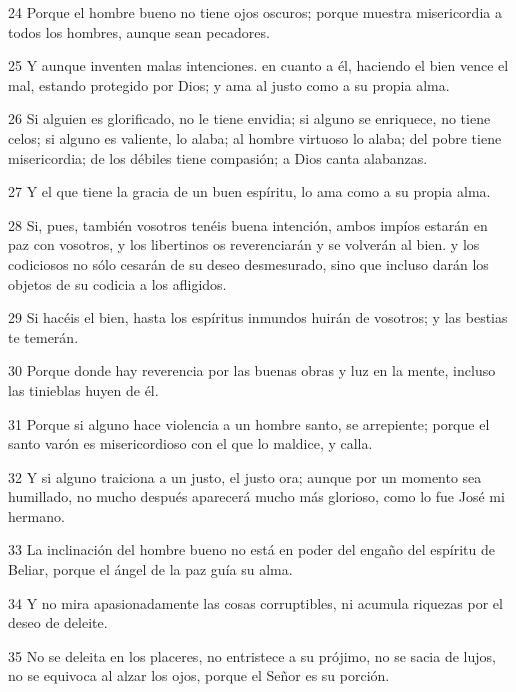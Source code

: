\par 24 Porque el hombre bueno no tiene ojos oscuros; porque muestra misericordia a todos los hombres, aunque sean pecadores.

\par 25 Y aunque inventen malas intenciones. en cuanto a él, haciendo el bien vence el mal, estando protegido por Dios; y ama al justo como a su propia alma.

\par 26 Si alguien es glorificado, no le tiene envidia; si alguno se enriquece, no tiene celos; si alguno es valiente, lo alaba; al hombre virtuoso lo alaba; del pobre tiene misericordia; de los débiles tiene compasión; a Dios canta alabanzas.

\par 27 Y el que tiene la gracia de un buen espíritu, lo ama como a su propia alma.

\par 28 Si, pues, también vosotros tenéis buena intención, ambos impíos estarán en paz con vosotros, y los libertinos os reverenciarán y se volverán al bien. y los codiciosos no sólo cesarán de su deseo desmesurado, sino que incluso darán los objetos de su codicia a los afligidos.

\par 29 Si hacéis el bien, hasta los espíritus inmundos huirán de vosotros; y las bestias te temerán.

\par 30 Porque donde hay reverencia por las buenas obras y luz en la mente, incluso las tinieblas huyen de él.

\par 31 Porque si alguno hace violencia a un hombre santo, se arrepiente; porque el santo varón es misericordioso con el que lo maldice, y calla.

\par 32 Y si alguno traiciona a un justo, el justo ora; aunque por un momento sea humillado, no mucho después aparecerá mucho más glorioso, como lo fue José mi hermano.

\par 33 La inclinación del hombre bueno no está en poder del engaño del espíritu de Beliar, porque el ángel de la paz guía su alma.

\par 34 Y no mira apasionadamente las cosas corruptibles, ni acumula riquezas por el deseo de deleite.

\par 35 No se deleita en los placeres, no entristece a su prójimo, no se sacia de lujos, no se equivoca al alzar los ojos, porque el Señor es su porción.

